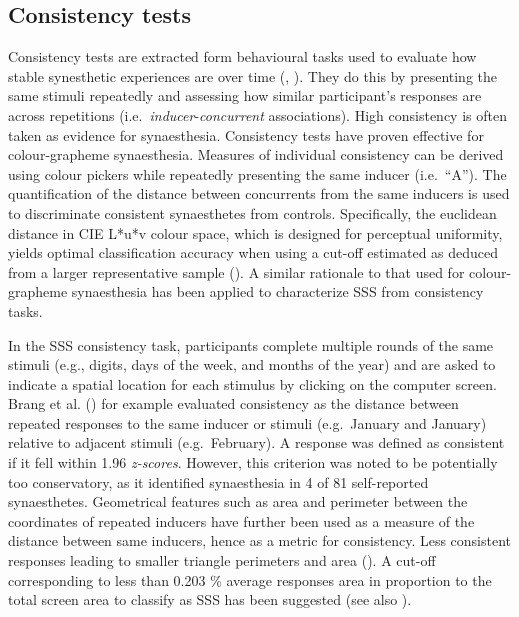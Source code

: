\documentclass[
  man,
  longtable,
  a4paper,
  nolmodern,
  notxfonts,
  notimes,
  colorlinks=true,linkcolor=blue,citecolor=blue,urlcolor=blue]{apa7}
\begin{document}
\subsection{Consistency tests}\label{sec-consistency-tests}

Consistency tests are extracted form behavioural tasks used to evaluate
how stable synesthetic experiences are over time
(,
). They do this by presenting the same
stimuli repeatedly and assessing how similar participant's responses are
across repetitions (i.e.~\emph{inducer}-\emph{concurrent} associations).
High consistency is often taken as evidence for synaesthesia.
Consistency tests have proven effective for colour-grapheme
synaesthesia. Measures of individual consistency can be derived using
colour pickers while repeatedly presenting the same inducer
(i.e.~``A''). The quantification of the distance between concurrents
from the same inducers is used to discriminate consistent synaesthetes
from controls. Specifically, the euclidean distance in CIE L*u*v colour
space, which is designed for perceptual uniformity, yields optimal
classification accuracy when using a cut-off estimated as deduced from a
larger representative sample (). A similar rationale to that used for colour-grapheme
synaesthesia has been applied to characterize SSS from consistency
tasks.

In the SSS consistency task, participants complete multiple rounds of
the same stimuli (e.g., digits, days of the week, and months of the
year) and are asked to indicate a spatial location for each stimulus by
clicking on the computer screen. Brang et al.
() for example evaluated consistency as
the distance between repeated responses to the same inducer or stimuli
(e.g.~January and January) relative to adjacent stimuli (e.g.~February).
A response was defined as consistent if it fell within 1.96
\emph{z-scores}. However, this criterion was noted to be potentially too
conservatory, as it identified synaesthesia in 4 of 81 self-reported
synaesthetes. Geometrical features such as area and perimeter between
the coordinates of repeated inducers have further been used as a measure
of the distance between same inducers, hence as a metric for
consistency. Less consistent responses leading to smaller triangle
perimeters and area (). A
cut-off corresponding to less than 0.203 \% average responses area in
proportion to the total screen area to classify as SSS has been
suggested (see also ).
\end{document}
